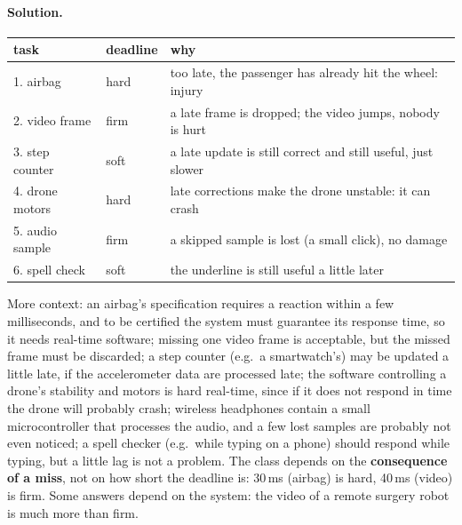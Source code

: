 \paragraph{Solution.}
\begin{center}
\begin{tabular}{l l p{8cm}}
\hline
\textbf{task} & \textbf{deadline} & \textbf{why} \\
\hline
1. airbag & hard & too late, the passenger has already hit the wheel: injury \\
2. video frame & firm & a late frame is dropped; the video jumps, nobody is hurt \\
3. step counter & soft & a late update is still correct and still useful, just slower \\
4. drone motors & hard & late corrections make the drone unstable: it can crash \\
5. audio sample & firm & a skipped sample is lost (a small click), no damage \\
6. spell check & soft & the underline is still useful a little later \\
\hline
\end{tabular}
\end{center}
More context: an airbag's specification requires a reaction within a few milliseconds, and to be certified the system must guarantee its response time, so it needs real-time software; missing one video frame is acceptable, but the missed frame must be discarded; a step counter (e.g.\ a smartwatch's) may be updated a little late, if the accelerometer data are processed late; the software controlling a drone's stability and motors is hard real-time, since if it does not respond in time the drone will probably crash; wireless headphones contain a small microcontroller that processes the audio, and a few lost samples are probably not even noticed; a spell checker (e.g.\ while typing on a phone) should respond while typing, but a little lag is not a problem. The class depends on the \textbf{consequence of a miss}, not on how short the deadline is: 30\,ms (airbag) is hard, 40\,ms (video) is firm. Some answers depend on the system: the video of a remote surgery robot is much more than firm.

